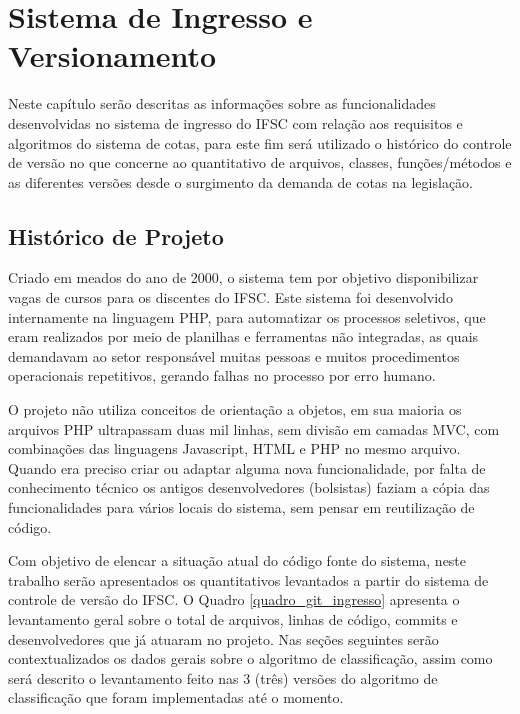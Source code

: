 \chapter{Sistema de Ingresso e Versionamento}
\label{chap:historicoversoes}

Neste capítulo serão descritas as informações sobre as funcionalidades desenvolvidas no sistema de ingresso do \gls{IFSC} com relação aos requisitos e algoritmos do sistema de cotas, para este fim será utilizado o histórico do controle de versão no que concerne ao quantitativo de arquivos, classes, funções/métodos e as diferentes versões desde o surgimento da demanda de cotas na legislação.

\section{Histórico de Projeto}
\label{historicopj}
Criado em meados do ano de 2000, o sistema tem por objetivo disponibilizar vagas de cursos para os discentes do \gls{IFSC}. Este sistema foi desenvolvido internamente na linguagem PHP, para automatizar os processos seletivos, que eram realizados por meio de planilhas e ferramentas não integradas, as quais demandavam ao setor responsável muitas pessoas e muitos procedimentos operacionais repetitivos, gerando falhas no processo por erro humano.

O projeto não utiliza conceitos de orientação a objetos, em sua maioria os arquivos PHP ultrapassam duas mil linhas, sem divisão em camadas \gls{MVC}, com combinações das linguagens Javascript, HTML e PHP no mesmo arquivo. Quando era preciso criar ou adaptar alguma nova funcionalidade, por falta de conhecimento técnico os antigos desenvolvedores (bolsistas) faziam a cópia das funcionalidades para vários locais do sistema, sem pensar em reutilização de código.

Com objetivo de elencar a situação atual do código fonte do sistema, neste trabalho serão apresentados os quantitativos levantados a partir do sistema de controle de versão do \gls{IFSC}. O Quadro \ref{quadro_git_ingresso} apresenta o levantamento geral sobre o total de arquivos, linhas de código, commits e desenvolvedores que já atuaram no projeto. Nas seções seguintes serão contextualizados os dados gerais sobre o algoritmo de classificação, assim como será descrito o levantamento feito nas 3 (três) versões do algoritmo de classificação que foram implementadas até o momento.




